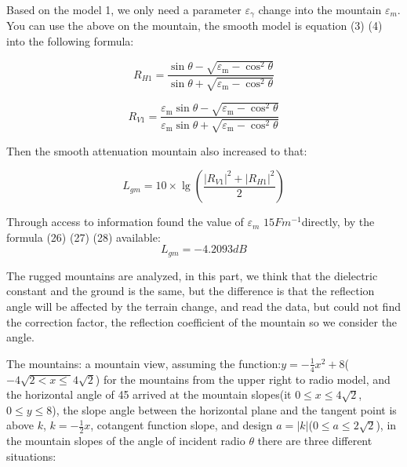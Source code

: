 \documentclass{mcmthesis}
\begin{document}
Based on the model 1, we only need a parameter ${\varepsilon _\gamma }$ change into the mountain ${\varepsilon _m }$. You can use the above on the mountain, the smooth model is equation (3) (4) into the following formula:

\begin{equation} \label{27}
{R_{H1}} = \frac{{\sin \theta  - \sqrt {{\varepsilon _{\text{m}}} - {{\cos }^2}\theta } }}{{\sin \theta  + \sqrt {{\varepsilon _{\text{m}}} - {{\cos }^2}\theta } }}
\end{equation}

\begin{equation} \label{28}
{R_{V1}} = \frac{{{\varepsilon _{\text{m}}}\sin \theta  - \sqrt {{\varepsilon _{\text{m}}} - {{\cos }^2}\theta } }}{{{\varepsilon _{\text{m}}}\sin \theta  + \sqrt {{\varepsilon _{\text{m}}} - {{\cos }^2}\theta } }}
\end{equation}

Then the smooth attenuation mountain also increased to that:

\begin{equation} \label{29}
{L_{gm}} = 10 \times \lg (\frac{{{{\left| {{R_{V1}}} \right|}^2} + {{\left| {{R_{H1}}} \right|}^2}}}{2})
\end{equation}

Through access to information found the value of ${\varepsilon _m }$ $15F{m^{ - 1}}$directly, by the formula (26) (27) (28) available:
\begin{equation} \label{30}
{L_{gm}} =  - 4.2093dB
\end{equation}

The rugged mountains are analyzed, in this part, we think that the dielectric constant and the ground is the same, but the difference is that the reflection angle will be affected by the terrain change, and read the data, but could not find the correction factor, the reflection coefficient of the mountain so we consider the angle.

The mountains: a mountain view, assuming the function:$y =  - \frac{1}{4}{x^2} + 8$($ - 4\sqrt {2 < x \leqslant } 4\sqrt 2 $) for the mountains from the upper right to radio model, and the horizontal angle of 45 arrived at the mountain slopes(it $0 \leqslant x \leqslant 4\sqrt 2 $, $0 \leqslant y \leqslant 8$), the slope angle between the horizontal plane and the tangent point is above $k$, $k =  - \frac{1}{2}x$, cotangent function slope, and design $a = |k|$($0 \leqslant a \leqslant 2\sqrt 2 $), in the mountain slopes of the angle of incident radio $\theta$ there are three different situations:
\end{document}

